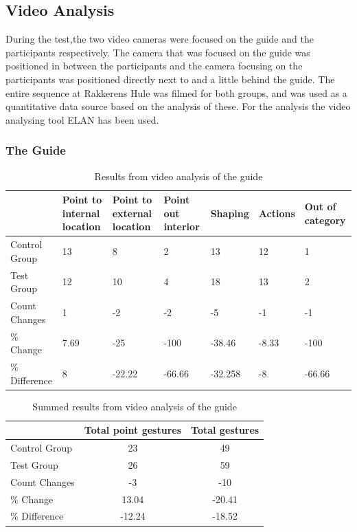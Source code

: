 \subsection{Video Analysis}
During the test,the two video cameras were focused on the guide and the participants respectively. The camera that was focused on the guide was positioned in between the participants and the camera focusing on the participants was positioned directly next to and a little behind the guide. The entire sequence at Rakkerens Hule was filmed for both groups, and was used as a quantitative data source based on the analysis of these. For the analysis the video analysing tool ELAN has been used. 

\subsubsection{The Guide}
\begin{table}
\begin{tabular}{| l | p{1.5cm} | p{1.4cm} | p{1.4cm} | l | l | p{1.5cm} |}\hline
 & Point to internal location & Point to external location & Point out interior & Shaping & Actions & Out of category \\ \hline
Control Group & 13 & 8 & 2 & 13 & 12 & 1 \\ \hline
Test Group & 12 & 10 & 4 & 18 & 13 & 2 \\ \hline
Count Changes & 1 & -2 & -2 & -5 & -1 & -1 \\ \hline
\% Change & 7.69 & -25 & -100 & -38.46 & -8.33 & -100 \\ \hline
\% Difference & 8 & -22.22 & -66.66 & -32.258 & -8 & -66.66 \\ \hline
\end{tabular}
\caption{Results from video analysis of the guide \label{table:guide1}}
\end{table}

\begin{table}
\begin{tabular}{| l | c | c |}\hline
 & Total point gestures & Total gestures \\ \hline
Control Group & 23 & 49 \\ \hline
Test Group & 26 & 59 \\ \hline
Count Changes & -3 & -10 \\ \hline
\% Change & 13.04 & -20.41 \\ \hline
\% Difference & -12.24 & -18.52 \\ \hline
\end{tabular}
\caption{Summed results from video analysis of the guide \label{table:guide2}}
\end{table}

